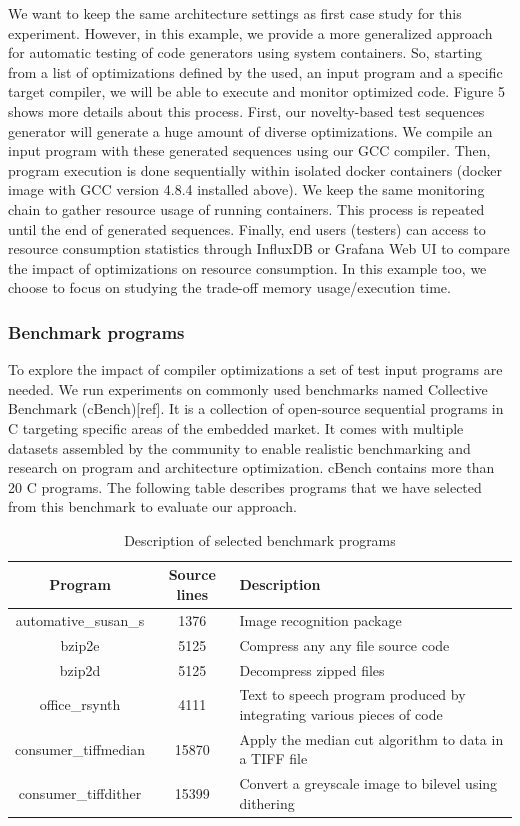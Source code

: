We want to keep the same architecture settings as first case study for this experiment. However, in this example, we provide a more generalized approach for automatic testing of code generators using system containers. So, starting from a list of  optimizations defined by the used, an input program and a specific target compiler, we will be able to execute and monitor optimized code. Figure 5 shows more details about this process. First, our novelty-based test sequences generator will generate a huge amount of diverse optimizations. We compile an input program with these generated sequences using our GCC compiler. Then, program execution is done sequentially within isolated docker containers (docker image with GCC version 4.8.4 installed above). We keep the same monitoring chain to gather resource usage of running containers. This process is repeated until the end of generated sequences. Finally, end users (testers) can access to resource consumption statistics through InfluxDB or Grafana Web UI to compare the impact of optimizations on resource consumption. In this example too, we choose to focus on studying the trade-off memory usage/execution time. 
\subsubsection{Benchmark programs}
To explore the impact of compiler optimizations a set of test input programs are needed. We run experiments on commonly used benchmarks named Collective Benchmark (cBench)[ref]. It is a collection of open-source sequential programs in C targeting specific areas of the embedded market. It comes with multiple datasets assembled by the community to enable realistic benchmarking and research on program and architecture optimization. cBench contains more than 20 C programs. The following table describes programs that we have selected from this benchmark to evaluate our approach.
\begin{table}[h]
	\begin{center}
		\begin{tabular}{|c|c|p{4cm}|}
			\hline
			\textbf{Program} & \textbf{Source lines} & \textbf{Description}\\
			\hline
			automative\_susan\_s & 1376 & Image recognition package\\
			\hline
			bzip2e & 5125 & Compress any any file
			source code \\
			\hline
			bzip2d & 5125 & Decompress zipped files \\
			\hline
			office\_rsynth & 4111 & Text to speech program produced by integrating various pieces of code\\
			\hline
			consumer\_tiffmedian& 15870 & Apply the median cut algorithm to data in a TIFF file
			\\
			
			\hline
			 consumer\_tiffdither& 15399 & Convert a greyscale image to bilevel using dithering
			 \\
			\hline
			
		\end{tabular}
		
	\end{center}
	\caption {Description of selected benchmark programs}
\end{table}
